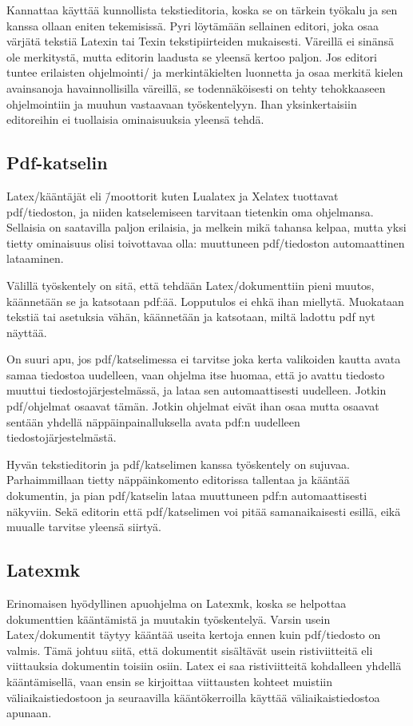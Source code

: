Kannattaa käyttää kunnollista tekstieditoria, koska se on tärkein
työkalu ja sen kanssa ollaan eniten tekemisissä. Pyri löytämään
sellainen editori, joka osaa värjätä tekstiä Latexin tai Texin
tekstipiirteiden mukaisesti. Väreillä ei sinänsä ole merkitystä, mutta
editorin laadusta se yleensä kertoo paljon. Jos editori tuntee
erilaisten ohjelmointi\-/{} ja merkintäkielten luonnetta ja osaa merkitä
kielen avainsanoja havainnollisilla väreillä, se todennäköisesti on
tehty tehokkaaseen ohjelmointiin ja muuhun vastaavaan työskentelyyn.
Ihan yksinkertaisiin editoreihin ei tuollaisia ominaisuuksia yleensä
tehdä.

\subsection{Pdf-katselin}

Latex\-/kääntäjät eli \=/moottorit kuten Lualatex ja Xelatex tuottavat
pdf\-/tiedoston, ja niiden katselemiseen tarvitaan tietenkin oma
ohjelmansa. Sellaisia on saatavilla paljon erilaisia, ja melkein mikä
tahansa kelpaa, mutta yksi tietty ominaisuus olisi toivottavaa olla:
muuttuneen pdf\-/tiedoston automaattinen lataaminen.

Välillä työskentely on sitä, että tehdään Latex\-/dokumenttiin pieni
muutos, käännetään se ja katsotaan pdf:ää. Lopputulos ei ehkä ihan
miellytä. Muokataan tekstiä tai asetuksia vähän, käännetään ja
katsotaan, miltä ladottu pdf nyt näyttää.

On suuri apu, jos pdf\-/katselimessa ei tarvitse joka kerta valikoiden
kautta avata samaa tiedostoa uudelleen, vaan ohjelma itse huomaa, että
jo avattu tiedosto muuttui tiedostojärjestelmässä, ja lataa sen
automaattisesti uudelleen. Jotkin pdf\-/ohjelmat osaavat tämän. Jotkin
ohjelmat eivät ihan osaa mutta osaavat sentään yhdellä
näppäinpainalluksella avata pdf:n uudelleen tiedostojärjestelmästä.

Hyvän tekstieditorin ja pdf\-/katselimen kanssa työskentely on sujuvaa.
Parhaimmillaan tietty näppäinkomento editorissa tallentaa ja kääntää
dokumentin, ja pian pdf\-/katselin lataa muuttuneen pdf:n
automaattisesti näkyviin. Sekä editorin että pdf\-/katselimen voi pitää
sa\-man\-aikai\-ses\-ti esillä, eikä muualle tarvitse yleensä siirtyä.

\subsection{Latexmk}
\label{luku:latexmk}

Erin\-omaisen hyödyllinen apu\-ohjelma on Latexmk, koska se helpottaa
dokumenttien kääntämistä ja muutakin työskentelyä. Varsin usein
Latex\-/dokumentit täytyy kääntää useita kertoja ennen kuin
pdf\-/tiedosto on valmis. Tämä johtuu siitä, että dokumentit sisältävät
usein ristiviitteitä eli viittauksia dokumentin toisiin osiin. Latex ei
saa ristiviitteitä kohdalleen yhdellä kääntämisellä, vaan ensin se
kirjoittaa viittausten kohteet muistiin väliaikaistiedostoon ja
seuraavilla kääntökerroilla käyttää väliaikaistiedostoa apunaan.

